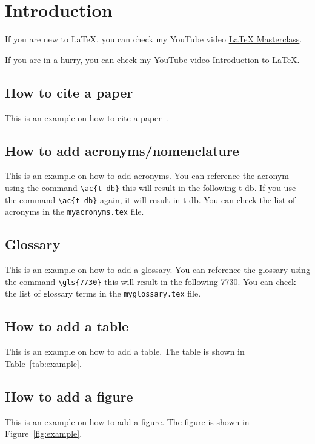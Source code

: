 \section{Introduction}\label{sec:introduction}

If you are new to \LaTeX{}, you can check my YouTube video \href{https://youtu.be/CjuYkcA35dw}{\LaTeX{} Masterclass}.

If you are in a hurry, you can check my YouTube video \href{https://youtu.be/g0YdIs4oJm8}{Introduction to \LaTeX{}}.

\subsection{How to cite a paper}\label{subsec:how-to-cite-a-paper}
This is an example on how to cite a paper~\cite{Tartarini2020a}.

\subsection{How to add acronyms/nomenclature}\label{subsec:how-to-add-acronyms}
This is an example on how to add acronyms.
You can reference the acronym using the command \verb!\ac{t-db}! this will result in the following \ac{t-db}.
If you use the command \verb!\ac{t-db}! again, it will result in \ac{t-db}.
You can check the list of acronyms in the \texttt{myacronyms.tex} file.

\subsection{Glossary}\label{subsec:glossary}

This is an example on how to add a glossary.
You can reference the glossary using the command \verb!\gls{7730}! this will result in the following \gls{7730}.
You can check the list of glossary terms in the \texttt{myglossary.tex} file.

\subsection{How to add a table}\label{subsec:how-to-add-a-table}
This is an example on how to add a table.
The table is shown in Table~\ref{tab:example}.



\subsection{How to add a figure}\label{subsec:how-to-add-a-figure}
This is an example on how to add a figure.
The figure is shown in Figure~\ref{fig:example}.

